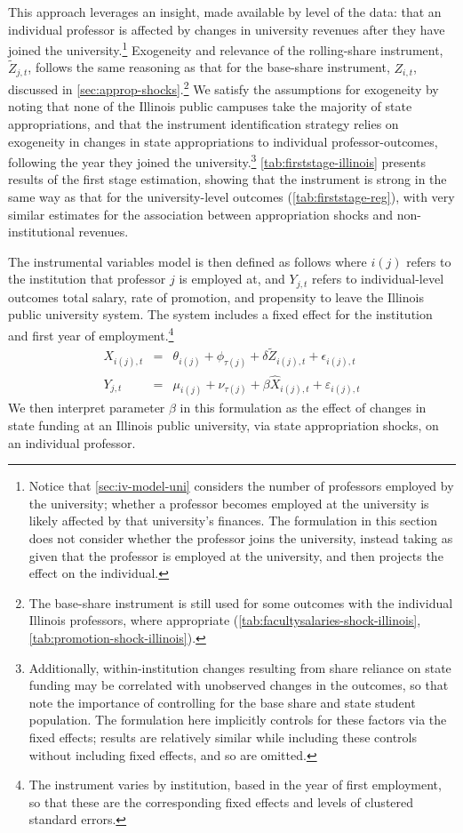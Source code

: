 \documentclass[notitlepage,12pt]{article}
\renewcommand{\tilde}[1]{\widetilde{#1}}                                   %
\begin{document}
This approach leverages an insight, made available by level of the data: that an individual professor is affected by changes in university revenues after they have joined the university.\footnote{
    Notice that \autoref{sec:iv-model-uni} considers the number of professors employed by the university; whether a professor becomes employed at the university is likely affected by that university's finances.
    The formulation in this section does not consider whether the professor joins the university, instead taking as given that the professor is employed at the university, and then projects the effect on the individual.
}
Exogeneity and relevance of the rolling-share instrument, $\tilde Z_{j,t}$, follows the same reasoning as that for the base-share instrument, $Z_{i,t}$, discussed in \autoref{sec:approp-shocks}.\footnote{
    The base-share instrument is still used for some outcomes with the individual Illinois professors, where appropriate (\autoref{tab:facultysalaries-shock-illinois}, \ref{tab:promotion-shock-illinois}).
}
We satisfy the assumptions for exogeneity by noting that none of the Illinois public campuses take the majority of state appropriations, and that the instrument identification strategy relies on exogeneity in changes in state appropriations to individual professor-outcomes, following the year they joined the university.\footnote{
    Additionally, within-institution changes resulting from share reliance on state funding may be correlated with unobserved changes in the outcomes, so that \cite{NBERw27885} note the importance of controlling for the base share and state student population.
    The formulation here implicitly controls for these factors via the fixed effects; results are relatively similar while including these controls without including fixed effects, and so are omitted.
}
\autoref{tab:firststage-illinois} presents results of the first stage estimation, showing that the instrument is strong in the same way as that for the university-level outcomes (\autoref{tab:firststage-reg}), with very similar estimates for the association between appropriation shocks and non-institutional revenues.

The instrumental variables model is then defined as follows where $i(j)$ refers to the institution that professor $j$ is employed at, and $Y_{j,t}$ refers to individual-level outcomes total salary, rate of promotion, and propensity to leave the Illinois public university system.
The system includes a fixed effect for the institution and first year of employment.\footnote{
    The instrument varies by institution, based in the year of first employment, so that these are the corresponding fixed effects and levels of clustered standard errors.
}
\begin{eqnarray}
    \label{eqn:secondstage1_indiv}
    X_{i(j),t} &=& \theta_{i(j)} + \phi_{\tau(j)} + \delta \tilde Z_{i(j),t} + \epsilon_{i(j),t} \\
    \label{eqn:secondstage2_indiv}
    Y_{j,t} &=& \mu_{i(j)} + \nu_{\tau(j)} + \beta \widehat X_{i(j),t} + \varepsilon_{i(j),t}
\end{eqnarray}
We then interpret parameter $\beta$ in this formulation as the effect of changes in state funding at an Illinois public university, via state appropriation shocks, on an individual professor.
\end{document}
